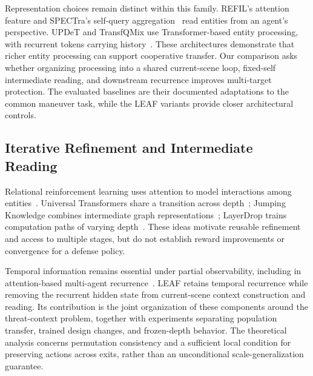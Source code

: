 Representation choices remain distinct within this family. REFIL's attention feature and SPECTra's self-query aggregation~\cite{park2026spectra} read entities from an agent's perspective. UPDeT and TransfQMix use Transformer-based entity processing, with recurrent tokens carrying history~\cite{hu2021updet,transfqmix2023}. These architectures demonstrate that richer entity processing can support cooperative transfer. Our comparison asks whether organizing processing into a shared current-scene loop, fixed-self intermediate reading, and downstream recurrence improves multi-target protection. The evaluated baselines are their documented adaptations to the common maneuver task, while the LEAF variants provide closer architectural controls.

\subsection{Iterative Refinement and Intermediate Reading}
Relational reinforcement learning uses attention to model interactions among entities~\cite{zambaldi2019relational}. Universal Transformers share a transition across depth~\cite{dehghani2019universal}; Jumping Knowledge combines intermediate graph representations~\cite{xu2018jk}; LayerDrop trains computation paths of varying depth~\cite{fan2020layerdrop}. These ideas motivate reusable refinement and access to multiple stages, but do not establish reward improvements or convergence for a defense policy.

Temporal information remains essential under partial observability, including in attention-based multi-agent recurrence~\cite{phan2023aerial}. LEAF retains temporal recurrence while removing the recurrent hidden state from current-scene context construction and reading. Its contribution is the joint organization of these components around the threat-context problem, together with experiments separating population transfer, trained design changes, and frozen-depth behavior. The theoretical analysis concerns permutation consistency and a sufficient local condition for preserving actions across exits, rather than an unconditional scale-generalization guarantee.
